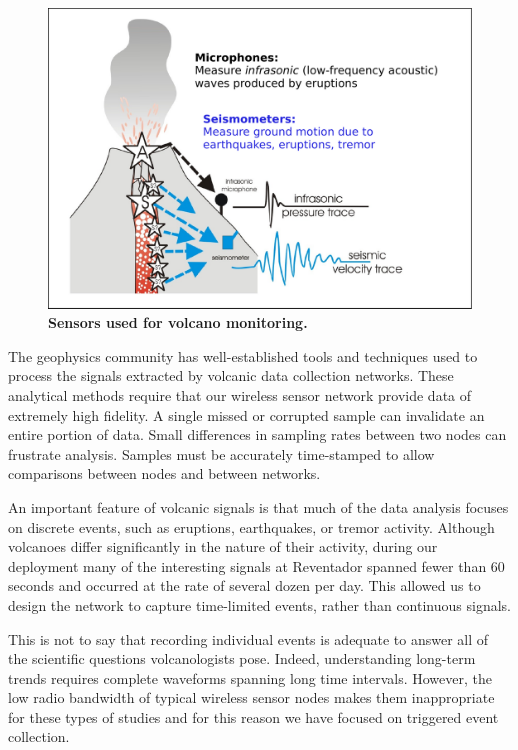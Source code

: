 \begin{figure}[t]
\begin{center}
\includegraphics[width=0.9\hsize]{./2-related/figs/NewCartoon.pdf}
\end{center}
\caption{\textbf{Sensors used for volcano monitoring.}}
\label{introduction-fig-cartoon}
\end{figure}

The geophysics community has well-established tools and techniques used to
process the signals extracted by volcanic data collection networks. These
analytical methods require that our wireless sensor network provide data of
extremely high fidelity. A single missed or corrupted sample can invalidate
an entire portion of data. Small differences in sampling rates between two
nodes can frustrate analysis. Samples must be accurately time-stamped to
allow comparisons between nodes and between networks.

An important feature of volcanic signals is that much of the data analysis
focuses on discrete events, such as eruptions, earthquakes, or tremor
activity. Although volcanoes differ significantly in the nature of their
activity, during our deployment many of the interesting signals at Reventador
spanned fewer than 60 seconds and occurred at the rate of several dozen per
day. This allowed us to design the network to capture time-limited events,
rather than continuous signals.

This is not to say that recording individual events is adequate to answer all
of the scientific questions volcanologists pose. Indeed, understanding
long-term trends requires complete waveforms spanning long time intervals.
However, the low radio bandwidth of typical wireless sensor nodes makes them
inappropriate for these types of studies and for this reason we have focused
on triggered event collection.


